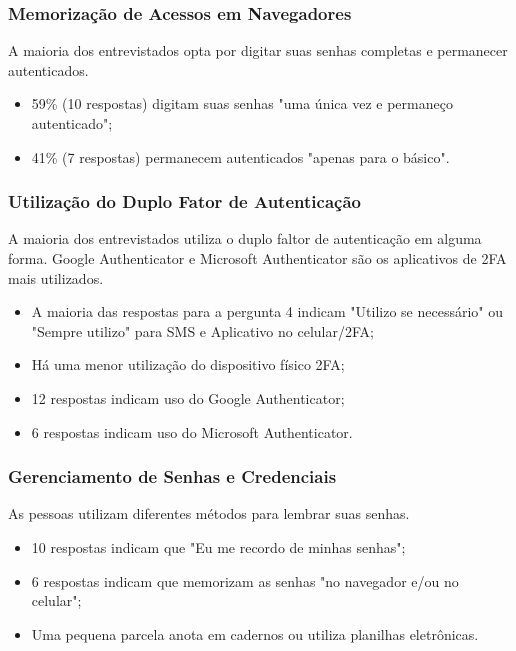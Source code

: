 \documentclass[12pt]{article}
\begin{document}
\FloatBarrier

\subsubsection{Memorização de Acessos em Navegadores}

A maioria dos entrevistados opta por digitar suas senhas completas e permanecer autenticados.

\begin{itemize}
  \item 59\% (10 respostas) digitam suas senhas "uma única vez e permaneço autenticado";
  \item 41\% (7 respostas) permanecem autenticados "apenas para o básico".
\end{itemize}

\subsubsection{Utilização do Duplo Fator de Autenticação}

A maioria dos entrevistados utiliza o duplo faltor de autenticação em alguma forma.
Google Authenticator e Microsoft Authenticator são os aplicativos de 2FA mais utilizados.

\begin{itemize}
  \item A maioria das respostas para a pergunta 4 indicam "Utilizo se necessário" ou
  "Sempre utilizo" para SMS e Aplicativo no celular/2FA;
  \item Há uma menor utilização do dispositivo físico 2FA;
  \item 12 respostas indicam uso do Google Authenticator;
  \item 6 respostas indicam uso do Microsoft Authenticator.
\end{itemize}

\subsubsection{Gerenciamento de Senhas e Credenciais}

As pessoas utilizam diferentes métodos para lembrar suas senhas.

\begin{itemize}
  \item 10 respostas indicam que "Eu me recordo de minhas senhas";
  \item 6 respostas indicam que memorizam as senhas "no navegador e/ou no celular";
  \item Uma pequena parcela anota em cadernos ou utiliza planilhas eletrônicas.
\end{itemize}
\end{document}
